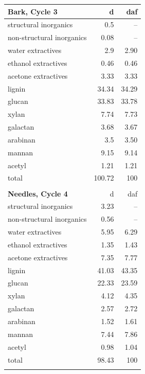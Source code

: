 \documentclass[12pt,titlepage]{article}
\begin{document}
\begin{longtable}{lrr}
    \textbf{Bark, Cycle 3} & d & daf \\
    \midrule
    structural inorganics     & 0.5    & -- \\
    non-structural inorganics & 0.08   & -- \\
    water extractives         & 2.9    & 2.90 \\
    ethanol extractives       & 0.46   & 0.46 \\
    acetone extractives       & 3.33   & 3.33 \\
    lignin                    & 34.34  & 34.29 \\
    glucan                    & 33.83  & 33.78 \\
    xylan                     & 7.74   & 7.73 \\
    galactan                  & 3.68   & 3.67 \\
    arabinan                  & 3.5    & 3.50 \\
    mannan                    & 9.15   & 9.14 \\
    acetyl                    & 1.21   & 1.21 \\
    total                     & 100.72 & 100 \\
    \\

    \textbf{Needles, Cycle 4} & d & daf \\
    \midrule
    structural inorganics     & 3.23  & -- \\
    non-structural inorganics & 0.56  & -- \\
    water extractives         & 5.95  & 6.29 \\
    ethanol extractives       & 1.35  & 1.43 \\
    acetone extractives       & 7.35  & 7.77 \\
    lignin                    & 41.03 & 43.35 \\
    glucan                    & 22.33 & 23.59 \\
    xylan                     & 4.12  & 4.35 \\
    galactan                  & 2.57  & 2.72 \\
    arabinan                  & 1.52  & 1.61 \\
    mannan                    & 7.44  & 7.86 \\
    acetyl                    & 0.98  & 1.04 \\
    total                     & 98.43 & 100 \\
    \\


\end{longtable}
\end{document}
